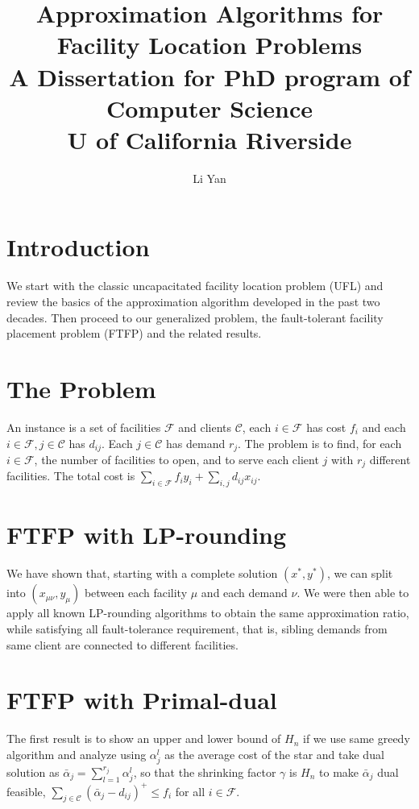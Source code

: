 \documentclass{article}
\title{Approximation Algorithms for Facility Location Problems\\A
  Dissertation for PhD program of Computer Science\\U of California
  Riverside} \author{Li Yan}
\begin{document}
\maketitle

\section{Introduction}
We start with the classic uncapacitated facility location problem
(UFL) and review the basics of the approximation algorithm developed
in the past two decades. Then proceed to our generalized problem, the
fault-tolerant facility placement problem (FTFP) and the related
results.

\section{The Problem}
An instance is a set of facilities $\mathcal F$ and clients $\mathcal
C$, each $i\in \mathcal F$ has cost $f_i$ and each $i\in\mathcal F,
j\in\mathcal C$ has $d_{ij}$. Each $j\in\mathcal C$ has demand
$r_j$. The problem is to find, for each $i\in\mathcal F$, the number
of facilities to open, and to serve each client $j$ with $r_j$
different facilities. The total cost is $\sum_{i\in\mathcal F} f_i y_i
+ \sum_{i,j} d_{ij} x_{ij}$.

\section{FTFP with LP-rounding}
We have shown that, starting with a complete solution $(x^\ast,
y^\ast)$, we can split into $(x_{\mu\nu}, y_\mu)$ between each
facility $\mu$ and each demand $\nu$. We were then able to apply all
known LP-rounding algorithms to obtain the same approximation ratio,
while satisfying all fault-tolerance requirement, that is, sibling
demands from same client are connected to different facilities.

\section{FTFP with Primal-dual}
The first result is to show an upper and lower bound of $H_n$ if we
use same greedy algorithm and analyze using $\alpha_j^l$ as the
average cost of the star and take dual solution as $\bar \alpha_j =
\sum_{l=1}^{r_j} \alpha_j^l$, so that the shrinking factor $\gamma$ is
$H_n$ to make $\bar \alpha_j$ dual feasible, $\sum_{j\in\mathcal C}
(\bar \alpha_j - d_{ij})^+ \leq f_i$ for all $i \in \mathcal F$.
\end{document}

